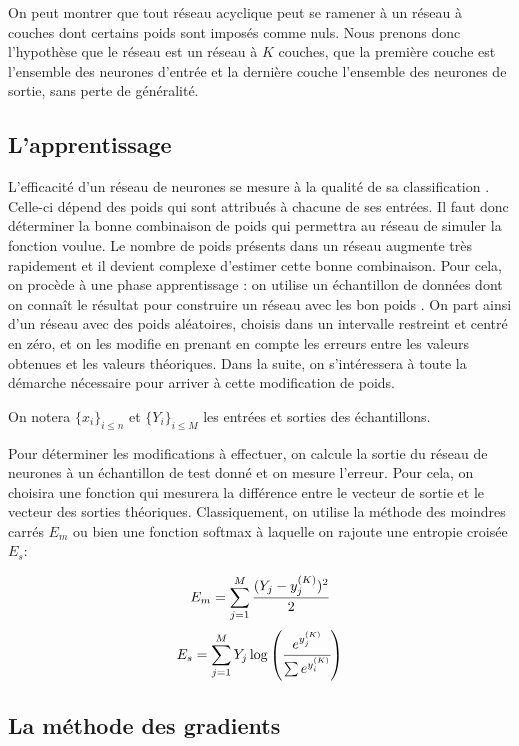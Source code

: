 On peut montrer que tout réseau acyclique peut se ramener à un réseau à couches
dont certains poids sont imposés comme nuls. Nous prenons donc l'hypothèse que
le réseau est un réseau à $K$ couches, que la première couche est l'ensemble des
 neurones d'entrée et la dernière couche l'ensemble des neurones de sortie, sans
 perte de généralité.

\subsection{L'apprentissage}

L'efficacité d'un réseau de neurones se mesure à la qualité de sa classification
. Celle-ci dépend des poids qui sont attribués à chacune de ses entrées. Il faut
 donc déterminer la bonne combinaison de poids qui permettra au réseau de
simuler la fonction voulue. Le nombre de poids présents dans un réseau augmente
très rapidement et il devient complexe d'estimer cette bonne combinaison. Pour
cela, on procède à une phase apprentissage : on utilise un échantillon de
données dont on connaît le résultat pour construire un réseau avec les bon poids
. On part ainsi d'un réseau avec des poids aléatoires, choisis dans un
intervalle restreint et centré en zéro, et on les modifie en prenant en compte
les erreurs entre les valeurs obtenues et les valeurs théoriques. Dans la suite,
 on s'intéressera à toute la démarche nécessaire pour arriver à cette modification de poids.

\medskip

On notera $\{x_i\}_{i \leq n}$ et $\{Y_i\}_{i \leq M}$ les entrées et sorties
des échantillons.

\medskip

Pour déterminer les modifications à effectuer, on calcule la sortie du réseau de
 neurones à un échantillon de test donné et on mesure l'erreur. Pour cela,
on choisira une fonction qui mesurera la différence entre le vecteur de sortie
et le vecteur des sorties théoriques. Classiquement, on utilise la méthode des
moindres carrés $E_m$ ou bien une fonction softmax à laquelle on rajoute une
entropie croisée $E_s$:

\[E_m = \sum_{j = 1}^{M} \cfrac{(Y_j - y_j^{(K)})^2}{2}\]
\[E_s = \sum_{j = 1}^{M} Y_j \log \left(\cfrac{e^{y_j^{(K)}}}{\sum e^{y_i^{(K)}}}\right)\]

\subsection{La méthode des gradients}

